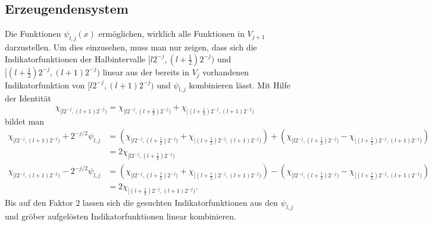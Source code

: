 \subsection{Erzeugendensystem}
Die Funktionen $\psi_{l,j}(x)$ ermöglichen, wirklich alle Funktionen
in $V_{j+1}$ darzustellen.
Um dies einzusehen, muss man nur zeigen, dass sich die Indikatorfunktionen
der Halbintervalle $[l2^{-j},(l+\frac12)2^{-j})$ und
$[(l+\frac12)2^{-j},(l+1)2^{-j})$ linear aus der bereits in $V_j$ vorhandenen
Indikatorfunktion von $[l2^{-j},(l+1)2^{-j})$ und $\psi_{l,j}$
kombinieren lässt.
Mit Hilfe der Identität
\[
\chi_{[l2^{-j},(l+1)2^{-j})}
=
\chi_{[l2^{-j},(l+\frac12)2^{-j})}
+
\chi_{[(l+\frac12)2^{-j},(l+1)2^{-j})}
\]
bildet man
\begin{align*}
\chi_{[l2^{-j},(l+1)2^{-j})}
+
2^{-j/2}\psi_{l,j}
&=
(
\chi_{[l2^{-j},(l+\frac12)2^{-j})}
+
\chi_{[(l+\frac12)2^{-j},(l+1)2^{-j})}
)
+
(
\chi_{[l2^{-j},(l+\frac12)2^{-j})}
-
\chi_{[(l+\frac12)2^{-j},(l+1)2^{-j})}
)
\\
&=
2
\chi_{[l2^{-j},(l+\frac12)2^{-j})}
\\
\chi_{[l2^{-j},(l+1)2^{-j})}
-
2^{-j/2}\psi_{l,j}
&=
(
\chi_{[l2^{-j},(l+\frac12)2^{-j})}
+
\chi_{[(l+\frac12)2^{-j},(l+1)2^{-j})}
)
-
(
\chi_{[l2^{-j},(l+\frac12)2^{-j})}
-
\chi_{[(l+\frac12)2^{-j},(l+1)2^{-j})}
)
\\
&=
2\chi_{[(l+\frac12)2^{-j},(l+1)2^{-j})}.
\end{align*}
Bis auf den Faktor $2$ lassen sich die gesuchten Indikatorfunktionen
aus den $\psi_{l,j}$ und gröber aufgelösten Indikatorfunktionen linear
kombinieren.

